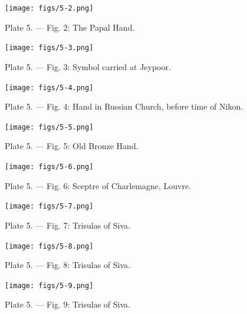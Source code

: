 \documentclass[a4paper, 11pt, oneside, english, landscape, twocolumn]{article}
\begin{document}
\begin{figure}[H]
\centering
\texttt{[image: figs/5-2.png]}
\caption{Plate 5. --- Fig. 2: The Papal Hand.}
\end{figure}

\begin{figure}[H]
\centering
\texttt{[image: figs/5-3.png]}
\caption{Plate 5. --- Fig. 3: Symbol carried at Jeypoor.}
\end{figure}

\begin{figure}[H]
\centering
\texttt{[image: figs/5-4.png]}
\caption{Plate 5. --- Fig. 4: Hand in Russian Church, before time of Nikon.}
\end{figure}

\begin{figure}[H]
\centering
\texttt{[image: figs/5-5.png]}
\caption{Plate 5. --- Fig. 5: Old Bronze Hand.}
\end{figure}

\begin{figure}[H]
\centering
\texttt{[image: figs/5-6.png]}
\caption{Plate 5. --- Fig. 6: Sceptre of Charlemagne, Louvre.}
\end{figure}

\begin{figure}[H]
\centering
\texttt{[image: figs/5-7.png]}
\caption{Plate 5. --- Fig. 7: Trisulas of Siva.}
\end{figure}

\begin{figure}[H]
\centering
\texttt{[image: figs/5-8.png]}
\caption{Plate 5. --- Fig. 8: Trisulas of Siva.}
\end{figure}

\begin{figure}[H]
\centering
\texttt{[image: figs/5-9.png]}
\caption{Plate 5. --- Fig. 9: Trisulas of Siva.}
\end{figure}
\clearpage
\end{document}
